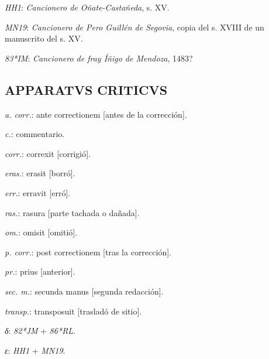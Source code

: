 \documentclass[11pt,a4paper,twoside]{article}
\begin{document}
\textit{HH1}: \textit{Cancionero de Oñate-Castañeda}, s. XV.

\textit{MN19}: \textit{Cancionero de Pero Guillén de Segovia}, copia del s. XVIII de un manuscrito del s. XV.

\textit{83*IM}: \textit{Cancionero de fray Íñigo de Mendoza}, 1483?

\subsection*{{\fontsize{11}{11.96}\selectfont APPARATVS CRITICVS}}

\textit{a. corr.}: ante correctionem [antes de la corrección].

\textit{c.}: commentario.

\textit{corr.}: correxit [corrigió].

\textit{eras.}: erasit [borró].

\textit{err.}: erravit [erró].

\textit{ras.}: rasura [parte tachada o dañada].

\textit{om.}: omisit [omitió].

\textit{p. corr.}: post correctionem [tras la corrección].

\textit{pr.}: prius [anterior].

\textit{sec. m.}: secunda manus [segunda redacción].

\textit{transp.}: transposuit [trasladó de sitio].

\textit{δ}: \textit{82*JM} + \textit{86*RL}.

\textit{ε}: \textit{HH1} + \textit{MN19}.
\end{document}
